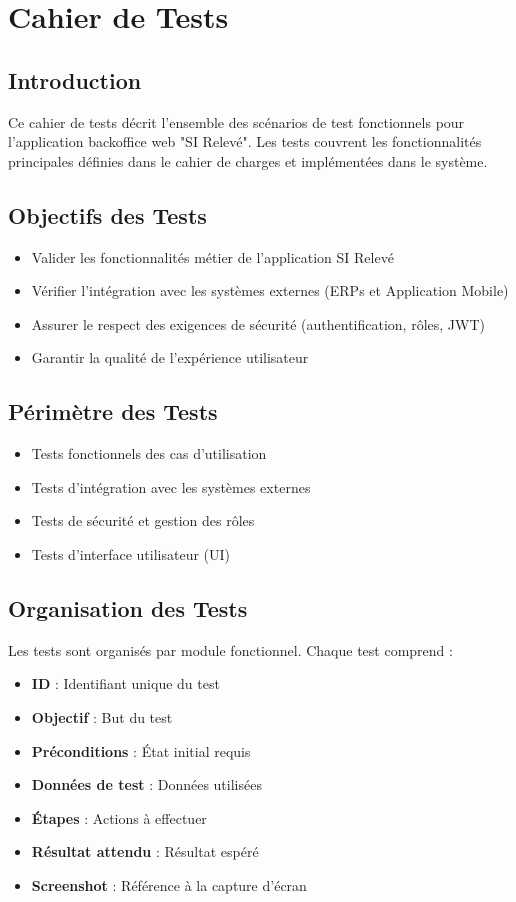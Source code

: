\section{Cahier de Tests}

\subsection{Introduction}
Ce cahier de tests décrit l'ensemble des scénarios de test fonctionnels pour l'application backoffice web "SI Relevé". Les tests couvrent les fonctionnalités principales définies dans le cahier de charges et implémentées dans le système.

\subsection{Objectifs des Tests}
\begin{itemize}
    \item Valider les fonctionnalités métier de l'application SI Relevé
    \item Vérifier l'intégration avec les systèmes externes (ERPs et Application Mobile)
    \item Assurer le respect des exigences de sécurité (authentification, rôles, JWT)
    \item Garantir la qualité de l'expérience utilisateur
\end{itemize}

\subsection{Périmètre des Tests}
\begin{itemize}
    \item Tests fonctionnels des cas d'utilisation
    \item Tests d'intégration avec les systèmes externes
    \item Tests de sécurité et gestion des rôles
    \item Tests d'interface utilisateur (UI)
\end{itemize}

\subsection{Organisation des Tests}
Les tests sont organisés par module fonctionnel. Chaque test comprend :
\begin{itemize}
    \item \textbf{ID} : Identifiant unique du test
    \item \textbf{Objectif} : But du test
    \item \textbf{Préconditions} : État initial requis
    \item \textbf{Données de test} : Données utilisées
    \item \textbf{Étapes} : Actions à effectuer
    \item \textbf{Résultat attendu} : Résultat espéré
    \item \textbf{Screenshot} : Référence à la capture d'écran
\end{itemize}

